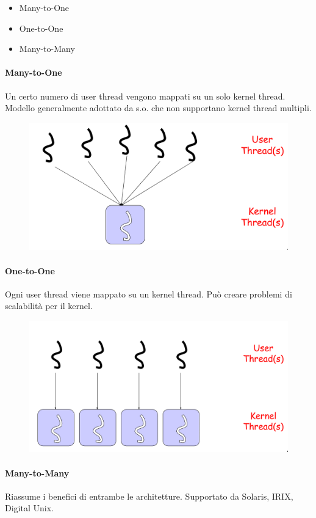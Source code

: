 \begin{itemize}
    \item Many-to-One
    \item One-to-One
    \item Many-to-Many
\end{itemize}

\paragraph{Many-to-One}
Un certo numero di user thread vengono mappati su un solo
kernel thread. Modello generalmente adottato da s.o. che non supportano kernel thread multipli.

\begin{figure} [h]
    \centering
    \includegraphics[width=0.5\linewidth]{Images/Screenshot 2024-12-23 at 13-14-46 so-02.1-scheduling - so-02.1-scheduling.pdf.png}
\end{figure}

\paragraph{One-to-One}
Ogni user thread viene mappato su un kernel thread. Può creare problemi di scalabilità per il kernel.

\begin{figure} [h]
    \centering
    \includegraphics[width=0.5\linewidth]{Images/Screenshot 2024-12-23 at 13-16-34 so-02.1-scheduling - so-02.1-scheduling.pdf.png}
\end{figure}
\newpage
\paragraph{Many-to-Many}
Riassume i benefici di entrambe le architetture. Supportato da Solaris, IRIX, Digital Unix.

